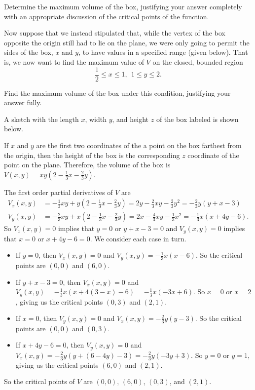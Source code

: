 \begin{exercises}
	\item Determine the maximum volume of the box, justifying your answer completely with an appropriate discussion of the critical points of the function. 

	\item Now suppose that we instead stipulated that, while the vertex of the box opposite the origin still had to lie on the plane, we were only going to permit the sides of the box, $x$ and $y$, to have values in a specified range (given below).  That is, we now want to find the maximum value of $V$ on the closed, bounded region
$$\frac{1}{2} \le x \le 1, \ \ 1 \le y \le 2.$$

Find the maximum volume of the box under this condition, justifying your answer fully.

    \ea

\begin{exerciseSolution}
\ba

	\item A sketch with the length $x$, width $y$, and height $z$ of the box labeled is shown below. 
\begin{center}
\end{center}

	\item If $x$ and $y$ are the first two coordinates of the a point on the box farthest from the origin, then the height of the box is the corresponding $z$ coordinate of the point on the plane. Therefore, the volume of the box is $V(x,y) = xy\left(2-\frac{1}{3}x - \frac{2}{3}y\right)$. 

	\item The first order partial derivatives of $V$ are 
\begin{align*}
V_x(x,y) &= -\frac{1}{3}xy+y\left(2-\frac{1}{3}x - \frac{2}{3}y\right) = 2y - \frac{2}{3}xy - \frac{2}{3}y^2 = -\frac{2}{3}y(y+x-3) \\
V_y(x,y) &= -\frac{2}{3}xy+x\left(2-\frac{1}{3}x - \frac{2}{3}y\right) = 2x - \frac{4}{3}xy - \frac{1}{3}x^2 = -\frac{1}{3}x(x+4y-6). 
\end{align*}
So $V_x(x,y) = 0$ implies that $y=0$ or $y+x-3=0$ and $V_y(x,y) = 0$ implies that $x=0$ or $x+4y-6=0$. We consider each case in turn.
\begin{itemize}
\item If $y=0$, then $V_x(x,y) = 0$ and $V_y(x,y) = -\frac{1}{3}x(x-6)$. So the critical points are $(0,0)$ and $(6,0)$. 
\item If $y+x-3=0$, then $V_x(x,y)=0$ and $V_y(x,y) = -\frac{1}{3}x(x+4(3-x)-6) = -\frac{1}{3}x(-3x+6)$. So $x=0$ or $x=2$, giving us the critical points $(0,3)$ and $(2,1)$. 
\item If $x=0$, then $V_y(x,y) = 0$ and $V_x(x,y) = -\frac{2}{3}y(y-3)$. So the critical points are $(0,0)$ and $(0,3)$. 
\item If $x+4y-6=0$, then $V_y(x,y)=0$ and $V_x(x,y) = -\frac{2}{3}y(y+(6-4y)-3) = -\frac{2}{3}y(-3y+3)$. So $y=0$ or $y=1$, giving us the critical points $(6,0)$ and $(2,1)$. 
\end{itemize}
So the critical points of $V$ are $(0,0)$, $(6,0)$, $(0,3)$, and $(2,1)$. 



\end{exerciseSolution}
\end{exercises}
